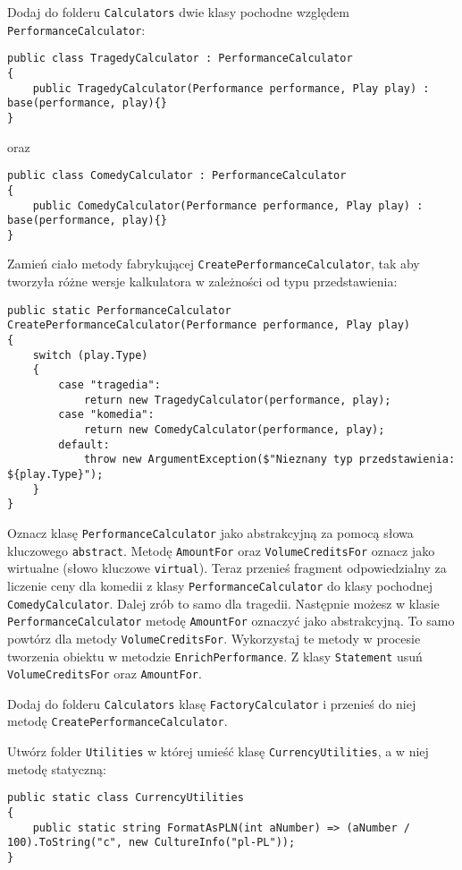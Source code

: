 Dodaj do folderu \texttt{Calculators} dwie klasy pochodne względem \texttt{PerformanceCalculator}:
\begin{lstlisting}
public class TragedyCalculator : PerformanceCalculator
{
	public TragedyCalculator(Performance performance, Play play) : base(performance, play){}
}
\end{lstlisting}
oraz
\begin{lstlisting}
public class ComedyCalculator : PerformanceCalculator
{
	public ComedyCalculator(Performance performance, Play play) : base(performance, play){}
}
\end{lstlisting}
Zamień ciało metody fabrykującej \texttt{CreatePerformanceCalculator}, tak aby tworzyła różne wersje kalkulatora w zależności od typu przedstawienia:
\begin{lstlisting}
public static PerformanceCalculator CreatePerformanceCalculator(Performance performance, Play play)
{
	switch (play.Type)
	{
		case "tragedia":
			return new TragedyCalculator(performance, play);
		case "komedia":
			return new ComedyCalculator(performance, play);
		default:
			throw new ArgumentException($"Nieznany typ przedstawienia: ${play.Type}");
	}
}
\end{lstlisting}
Oznacz klasę \texttt{PerformanceCalculator} jako abstrakcyjną za pomocą słowa kluczowego \texttt{abstract}. Metodę \texttt{AmountFor} oraz \texttt{VolumeCreditsFor} oznacz jako wirtualne (słowo kluczowe \texttt{virtual}). Teraz przenieś fragment odpowiedzialny za liczenie ceny dla komedii z klasy \texttt{PerformanceCalculator} do klasy pochodnej \texttt{ComedyCalculator}. Dalej zrób to samo dla tragedii. Następnie możesz w klasie \texttt{PerformanceCalculator} metodę \texttt{AmountFor} oznaczyć jako abstrakcyjną. To samo powtórz dla metody \texttt{VolumeCreditsFor}. Wykorzystaj te metody w procesie tworzenia obiektu w metodzie \texttt{EnrichPerformance}. Z klasy \texttt{Statement} usuń \texttt{VolumeCreditsFor} oraz \texttt{AmountFor}.

Dodaj do folderu \texttt{Calculators} klasę \texttt{FactoryCalculator} i przenieś do niej metodę \texttt{CreatePerformanceCalculator}. 

Utwórz folder \texttt{Utilities} w której umieść klasę \texttt{CurrencyUtilities}, a w niej metodę statyczną:
\begin{lstlisting}
public static class CurrencyUtilities
{
	public static string FormatAsPLN(int aNumber) => (aNumber / 100).ToString("c", new CultureInfo("pl-PL"));
}
\end{lstlisting}

